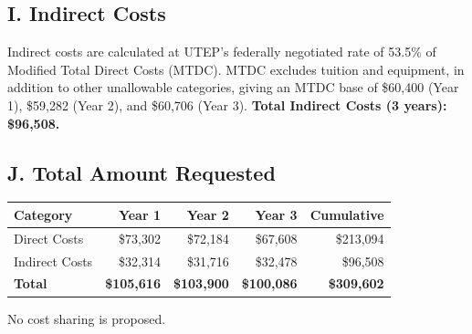 \documentclass[11pt,onecolumn]{article}
\begin{document}
\subsection*{I. Indirect Costs}
Indirect costs are calculated at UTEP's federally negotiated rate of 53.5\% of Modified Total
Direct Costs (MTDC). MTDC excludes tuition and equipment, in addition to other unallowable
categories, giving an MTDC base of \$60,400 (Year 1), \$59,282 (Year 2), and \$60,706 (Year 3).
\textbf{Total Indirect Costs (3 years): \$96,508.}

\subsection*{J. Total Amount Requested}
\begin{center}
\begin{tabular}{lrrrr}
	\toprule
	Category & Year 1 & Year 2 & Year 3 & Cumulative \\
	\midrule
	Direct Costs   & \$73,302  & \$72,184  & \$67,608  & \$213,094 \\
	Indirect Costs & \$32,314  & \$31,716  & \$32,478  & \$96,508 \\
	\midrule
	\textbf{Total} & \textbf{\$105,616} & \textbf{\$103,900} & \textbf{\$100,086} & \textbf{\$309,602} \\
	\bottomrule
\end{tabular}
\end{center}

No cost sharing is proposed.
\end{document}
